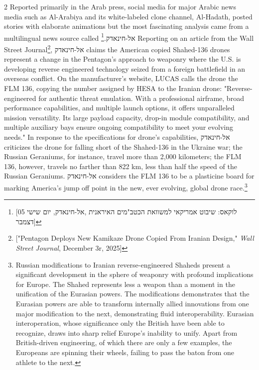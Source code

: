 \documentclass[10pt,a4paper,twoside]{article} %
\begin{document}
\begin{multicols}{2}
{\newline \indent Reported primarily in the Arab press, social media for major Arabic news media such as Al-Arabiya and its white-labeled clone channel, Al-Hadath, posted stories with elaborate animations but the most fascinating analysis came from a multilingual news source called \texthebrew{אל-חינאדק}.\footnote{[לוקאס: שיבוט אמריקאי למשוואת הכטב"מים האיראנית ,אל-חינאדק, יום שישי 05 דצמבר]} Reporting on an article from the Wall Street Journal\footnote{["Pentagon Deploys New Kamikaze Drone Copied From Iranian Design," \emph{Wall Street Journal}, December 3r, 2025]}, \texthebrew{אל-חינאדק} claims the American copied Shahed-136 drones represent a change in the Pentagon's approach to weaponry where the U.S. is developing reverse engineered technology seized from a foreign battlefield in an overseas conflict. \newline \indent On the manufacturer's website, LUCAS calls the drone the FLM 136, copying the number assigned by HESA to the Iranian drone: "Reverse-engineered for authentic threat emulation. With a professional airframe, broad performance capabilities, and multiple launch options, it offers unparalleled mission versatility. Its large payload capacity, drop-in module compatibility, and multiple auxiliary bays ensure ongoing compatibility to meet your evolving needs." In response to the specifications for drone's capabilities, \texthebrew{אל-חינאדק} criticizes the drone for falling short of the Shahed-136 in the Ukraine war; the Russian Geraniums, for instance, travel more than 2,000 kilometers; the FLM 136, however, travels no farther than 822 km, less than half the speed of the Russian Geraniums. \texthebrew{אל-חינאדק} considers the FLM 136 to be a plasticine board for marking America's jump off point in the new, ever evolving, global drone race.\footnote{Russian modifications to Iranian reverse-engineered Shaheds present a significant development in the sphere of weaponry with profound implications for Europe. The Shahed represents less a weapon than a moment in the unification of the Eurasian powers. The modifications demonstrates that the Eurasian powers are able to transform internally allied innovations from one major modification to the next, demonstrating fluid interoperability. Eurasian interoperation, whose significance only the British have been able to recognize, draws into sharp relief Europe's inability to unify. Apart from British-driven engineering, of which there are only a few examples, the Europeans are spinning their wheels, failing to pass the baton from one athlete to the next.}
}



\end{multicols}
\end{document}
